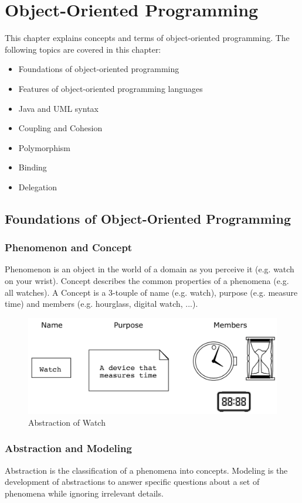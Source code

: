 
\section{Object-Oriented Programming}
This chapter explains concepts and terms of object-oriented programming.
The following topics are covered in this chapter:
\begin{itemize}
	\item Foundations of object-oriented programming
	\item Features of object-oriented programming languages
	\item Java and UML syntax
	\item Coupling and Cohesion
	\item Polymorphism
	\item Binding
	\item Delegation
\end{itemize}

\subsection{Foundations of Object-Oriented Programming}
\subsubsection*{Phenomenon and Concept}
Phenomenon is an object in the world of a domain as you perceive it (e.g. watch on your wrist).
Concept describes the common properties of a phenomena (e.g. all watches).
A Concept is a 3-touple of name (e.g. watch), purpose (e.g. measure time) and members (e.g. hourglass, digital watch, ...).

\begin{figure}[h!]
	\centering
	\includegraphics[width=\linewidth]{images/oop_abstraction}
	\caption{Abstraction of Watch}
\end{figure}

\subsubsection*{Abstraction and Modeling}
Abstraction is the classification of a phenomena into concepts.
Modeling is the development of abstractions to answer specific questions about a set of phenomena while ignoring irrelevant details.\newline

